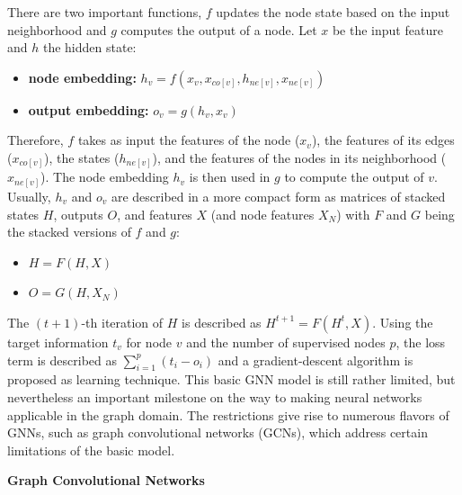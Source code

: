 \documentclass[a4paper,preprint]{sig-alternate}
\begin{document}
There are two important functions, $f$ updates the node state based on the input neighborhood and $g$ computes the output of a node.
Let $x$ be the input feature and $h$ the hidden state:
\begin{itemize}
    \item \textbf{node embedding:} $h_v = f(x_v, x_{co[v]}, h_{ne[v]}, x_{ne[v]})$
    \item \textbf{output embedding:} $o_v = g(h_v, x_v)$
\end{itemize}
Therefore, $f$ takes as input the features of the node ($x_v$), the features of its edges ($x_{co[v]}$), the states ($h_{ne[v]}$),
and the features of the nodes in its neighborhood ($x_{ne[v]}$). The node embedding $h_v$ is then used in $g$ to compute the output of $v$.
Usually, $h_v$ and $o_v$ are described in a more compact form as matrices of stacked states $H$,
outputs $O$, and features $X$ (and node features $X_N$) with $F$ and $G$ being the stacked versions of $f$ and $g$:
\begin{itemize}
    \item $H = F(H, X)$
    \item $O = G(H, X_N)$
\end{itemize}
The $(t + 1)$-th iteration of $H$ is described as $H^{t + 1} = F(H^t, X)$.
Using the target information $t_v$ for node $v$ and the number of supervised nodes $p$, 
the loss term is described as $\sum_{i=1}^p (t_i - o_i)$ and a gradient-descent algorithm is proposed as learning technique.\newline
This basic GNN model is still rather limited, but nevertheless an important milestone on the way to making
neural networks applicable in the graph domain. \cite{Liu_2020}
The restrictions give rise to numerous flavors of GNNs, such as graph convolutional networks (GCNs),
which address certain limitations of the basic model.\newline

\textbf{Graph Convolutional Networks}\newline
\end{document}
